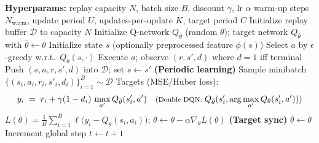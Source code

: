 \begin{algorithm}[H]
\caption{DQN with Replay, Periodic Batch Updates, and Target Network}
\label{alg:dqn-periodic}
\begin{algorithmic}[1]
\State \textbf{Hyperparams:} replay capacity $N$, batch size $B$, discount $\gamma$, lr $\alpha$
\State \hspace{2.6em} warm-up steps $N_{\text{warm}}$, update period $U$, updates-per-update $K$, target period $C$
\State Initialize replay buffer $\mathcal{D}$ to capacity $N$
\State Initialize Q-network $Q_\theta$ (random $\theta$); target network $Q_{\bar\theta}$ with $\bar\theta \gets \theta$
  \State Initialize state $s$ (optionally preprocessed feature $\phi(s)$)
    \State Select $a$ by $\epsilon$-greedy w.r.t.\ $Q_\theta(s,\cdot)$
    \State Execute $a$; observe $(r, s', d)$ where $d=1$ iff terminal
    \State Push $(s,a,r,s',d)$ into $\mathcal{D}$; set $s \gets s'$
    \State \textbf{(Periodic learning)} 
       
        \State Sample minibatch $\{(s_i,a_i,r_i,s'_i,d_i)\}_{i=1}^B \sim \mathcal{D}$
        \State Targets (MSE/Huber loss):
        \[
          y_i \;=\; r_i + \gamma(1-d_i)\,\max_{a'} Q_{\bar\theta}(s'_i,a') 
          \quad\text{\footnotesize (Double DQN: }Q_{\bar\theta}(s'_i,\arg\max_{a'}Q_\theta(s'_i,a'))\text{)}
        \]
        \State $L(\theta)=\tfrac{1}{B}\sum_{i=1}^B \ell\!\big(y_i - Q_\theta(s_i,a_i)\big)$; 
               \quad $\theta \leftarrow \theta - \alpha \nabla_\theta L(\theta)$
      \EndFor
    \EndIf
    \State \textbf{(Target sync)}  \quad $\bar\theta \leftarrow \theta$ \EndIf
    \State Increment global step $t \leftarrow t+1$
  \EndWhile
\EndFor
\end{algorithmic}
\end{algorithm}
